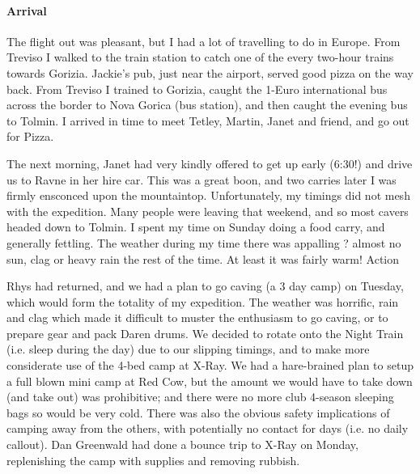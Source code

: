 \paragraph{Arrival}

The flight out was pleasant, but I had a lot of travelling to do in Europe. From Treviso I walked to the train station to catch one of the every two-hour trains towards Gorizia. Jackie's pub, just near the airport, served good pizza on the way back. From Treviso I trained to Gorizia, caught the 1-Euro international bus across the border to Nova Gorica (bus station), and then caught the evening bus to Tolmin. I arrived in time to meet Tetley, Martin, Janet and friend, and go out for Pizza.

The next morning, Janet had very kindly offered to get up early (6:30!) and drive us to Ravne in her hire car. This was a great boon, and two carries later I was firmly ensconced upon the mountaintop. Unfortunately, my timings did not mesh with the expedition. Many people were leaving that weekend, and so most cavers headed down to Tolmin. I spent my time on Sunday doing a food carry, and generally fettling. The weather during my time there was appalling ? almost no sun, clag or heavy rain the rest of the time. At least it was fairly warm!
Action

Rhys had returned, and we had a plan to go caving (a 3 day camp) on Tuesday, which would form the totality of my expedition. The weather was horrific, rain and clag which made it difficult to muster the enthusiasm to go caving, or to prepare gear and pack Daren drums. We decided to rotate onto the Night Train (i.e. sleep during the day) due to our slipping timings, and to make more considerate use of the 4-bed camp at X-Ray. We had a hare-brained plan to setup a full blown mini camp at Red Cow, but the amount we would have to take down (and take out) was prohibitive; and there were no more club 4-season sleeping bags so would be very cold. There was also the obvious safety implications of camping away from the others, with potentially no contact for days (i.e. no daily callout). Dan Greenwald had done a bounce trip to X-Ray on Monday, replenishing the camp with supplies and removing rubbish.

